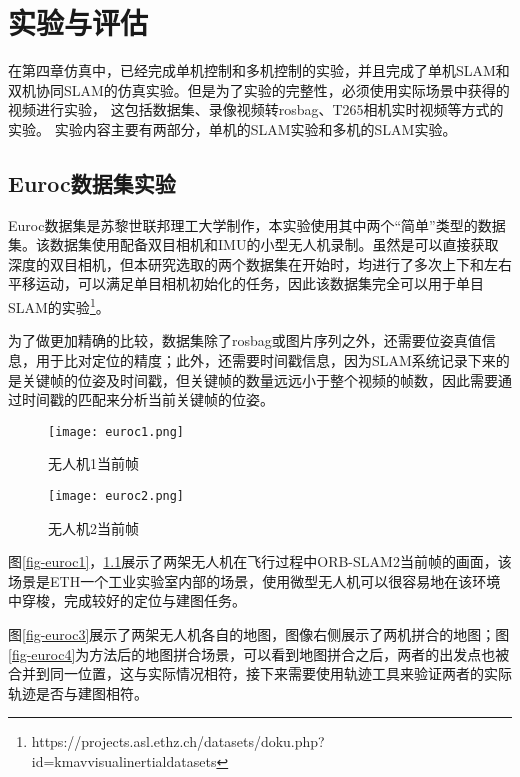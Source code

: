 \renewcommand{\baselinestretch}{1.5}
\fontsize{12pt}{13pt}\selectfont

\chapter{实验与评估} \label{experiment}

在第四章仿真中，已经完成单机控制和多机控制的实验，并且完成了单机SLAM和双机协同SLAM的仿真实验。但是为了实验的完整性，必须使用实际场景中获得的视频进行实验，
这包括数据集、录像视频转rosbag、T265相机实时视频等方式的实验。
实验内容主要有两部分，单机的SLAM实验和多机的SLAM实验。

\section{Euroc数据集实验}

Euroc数据集是苏黎世联邦理工大学制作，本实验使用其中两个“简单”类型的数据集。该数据集使用配备双目相机和IMU的小型无人机录制。虽然是可以直接获取深度的双目相机，但本研究选取的两个数据集在开始时，均进行了多次上下和左右平移运动，可以满足单目相机初始化的任务，因此该数据集完全可以用于单目SLAM的实验\footnote{https://projects.asl.ethz.ch/datasets/doku.php?id=kmavvisualinertialdatasets}。

为了做更加精确的比较，数据集除了rosbag或图片序列之外，还需要位姿真值信息，用于比对定位的精度；此外，还需要时间戳信息，因为SLAM系统记录下来的是关键帧的位姿及时间戳，但关键帧的数量远远小于整个视频的帧数，因此需要通过时间戳的匹配来分析当前关键帧的位姿。

\begin{figure}[htbp]
	\centering
	\begin{minipage}[t]{0.45\columnwidth} %
		\centering
		\texttt{[image: euroc1.png]}
		\caption{无人机1当前帧}
		\label{fig-euroc1}
	\end{minipage}
	\begin{minipage}[t]{0.45\columnwidth}
		\centering
		\texttt{[image: euroc2.png]}
		\caption{无人机2当前帧}
		\label{fig-euroc2}
	\end{minipage}
\end{figure}

图\ref{fig-euroc1}，\ref{fig-euroc2}展示了两架无人机在飞行过程中ORB-SLAM2当前帧的画面，该场景是ETH一个工业实验室内部的场景，使用微型无人机可以很容易地在该环境中穿梭，完成较好的定位与建图任务。

图\ref{fig-euroc3}展示了两架无人机各自的地图，图像右侧展示了两机拼合的地图；图\ref{fig-euroc4}为方法后的地图拼合场景，可以看到地图拼合之后，两者的出发点也被合并到同一位置，这与实际情况相符，接下来需要使用轨迹工具来验证两者的实际轨迹是否与建图相符。

